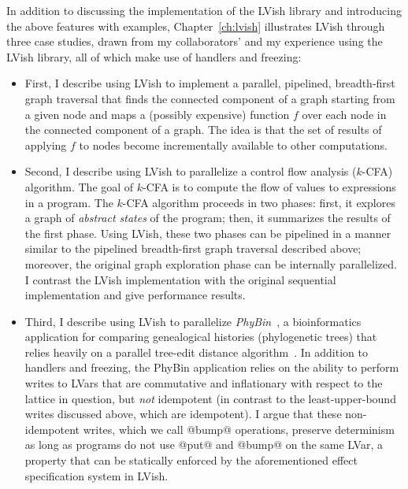 
In addition to discussing the implementation of the LVish library and
introducing the above features with examples, Chapter~\ref{ch:lvish}
illustrates LVish through three case studies, drawn from my
collaborators' and my experience using the LVish library, all of which
make use of handlers and freezing:
\begin{itemize}
\item First, I describe using LVish to implement a parallel,
  pipelined, breadth-first graph traversal that finds the connected
  component of a graph starting from a given node and maps a (possibly
  expensive) function $f$ over each node in the connected component of
  a graph.  The idea is that the set of results of applying $f$ to
  nodes become incrementally available to other computations.
\item Second, I describe using LVish to parallelize a control flow
  analysis ($k$-CFA) algorithm.  The goal of $k$-CFA is to compute the
  flow of values to expressions in a program.  The $k$-CFA algorithm
  proceeds in two phases: first, it explores a graph of \emph{abstract
    states} of the program; then, it summarizes the results of the
  first phase.  Using LVish, these two phases can be pipelined in a
  manner similar to the pipelined breadth-first graph traversal
  described above; moreover, the original graph exploration phase can
  be internally parallelized.  I contrast the LVish implementation
  with the original sequential implementation and give performance
  results.
\item Third, I describe using LVish to parallelize
  \emph{PhyBin}~\cite{PhyBin}, a bioinformatics application for
  comparing genealogical histories (phylogenetic trees) that relies
  heavily on a parallel tree-edit distance algorithm~\cite{hashrf}.
  In addition to handlers and freezing, the PhyBin application relies
  on the ability to perform writes to LVars that are commutative and
  inflationary with respect to the lattice in question, but \emph{not}
  idempotent (in contrast to the least-upper-bound writes discussed
  above, which are idempotent).  I argue that these non-idempotent
  writes, which we call @bump@ operations, preserve determinism as
  long as programs do not use @put@ and @bump@ on the same LVar, a
  property that can be statically enforced by the aforementioned
  effect specification system in LVish.  

\end{itemize}

